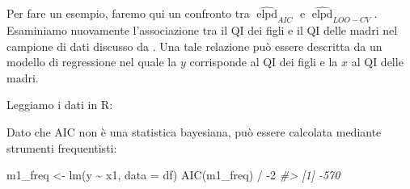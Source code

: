\documentclass[
  10pt,
  italian,
  a4paper,
  extrafontsizes,onecolumn,openright
  ]{memoir}
\newenvironment{Shaded}{\begin{snugshade}}{\end{snugshade}}
\newcommand{\AttributeTok}[1]{\textcolor[rgb]{0.77,0.63,0.00}{#1}}
\newcommand{\CommentTok}[1]{\textcolor[rgb]{0.56,0.35,0.01}{\textit{#1}}}
\newcommand{\DecValTok}[1]{\textcolor[rgb]{0.00,0.00,0.81}{#1}}
\newcommand{\FunctionTok}[1]{\textcolor[rgb]{0.00,0.00,0.00}{#1}}
\newcommand{\NormalTok}[1]{#1}
\newcommand{\OtherTok}[1]{\textcolor[rgb]{0.56,0.35,0.01}{#1}}
\newcommand{\SpecialCharTok}[1]{\textcolor[rgb]{0.00,0.00,0.00}{#1}}
\newcommand{\StringTok}[1]{\textcolor[rgb]{0.31,0.60,0.02}{#1}}
\DeclareMathOperator{\elpd}{elpd} %
\newcommand{\R}{\textsf{R}} %
\theoremstyle{definition}
\theoremstyle{definition}
\theoremstyle{definition}
\theoremstyle{definition}
\theoremstyle{remark}
\begin{document}
Per fare un esempio, faremo qui un confronto tra \(\widehat{\elpd}_{AIC}\) e \(\widehat{\elpd}_{LOO-CV}\). Esaminiamo nuovamente l'associazione tra il QI dei figli e il QI delle madri nel campione di dati discusso da \textcite{gelman2020regression}. Una tale relazione può essere descritta da un modello di regressione nel quale la \(y\) corrisponde al QI dei figli e la \(x\) al QI delle madri.

Leggiamo i dati in \R:

\begin{Shaded}
\end{Shaded}

Dato che AIC non è una statistica bayesiana, può essere calcolata mediante strumenti frequentisti:

\begin{Shaded}
\begin{Highlighting}[]
\NormalTok{m1\_freq }\OtherTok{\textless{}{-}} \FunctionTok{lm}\NormalTok{(y }\SpecialCharTok{\textasciitilde{}}\NormalTok{ x1, }\AttributeTok{data =}\NormalTok{ df)}
\FunctionTok{AIC}\NormalTok{(m1\_freq) }\SpecialCharTok{/} \SpecialCharTok{{-}}\DecValTok{2}
\CommentTok{\#\textgreater{} [1] {-}570}
\end{Highlighting}
\end{Shaded}
\end{document}
